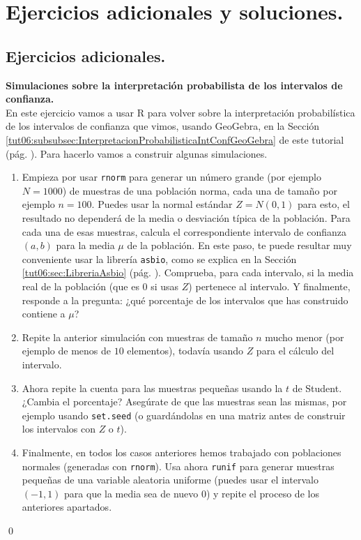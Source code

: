 \documentclass[10pt,a4paper]{article}\usepackage[]{graphicx}\usepackage[]{color}
\newcounter {cont01}
\begin{document}
\section{Ejercicios adicionales y soluciones.}
\label{tut06:sec:EjerciciosAdicionalesYSoluciones}

\subsection*{Ejercicios adicionales.}
\label{tut06:subsec:EjerciciosAdicionales}

\begin{ejercicio}
\label{tut06:ejercicio26}


{\bf Simulaciones sobre  la interpretación probabilista de los intervalos de confianza.}\\
\noindent
En este ejercicio vamos a usar R para volver sobre la interpretación probabilística de los intervalos de confianza que vimos, usando GeoGebra, en la Sección \ref{tut06:subsubsec:InterpretacionProbabilisticaIntConfGeoGebra} de este tutorial (pág. \pageref{tut06:subsubsec:InterpretacionProbabilisticaIntConfGeoGebra}). Para hacerlo vamos a construir algunas simulaciones.

\begin{enumerate}
  \item Empieza por usar {\tt rnorm} para generar un número grande (por ejemplo $N=1000$) de muestras de una población norma, cada una de tamaño por ejemplo $n=100$. Puedes usar la normal estándar $Z=N(0, 1)$ para esto, el resultado no dependerá de la media o desviación típica de la población. Para cada una de esas muestras, calcula el correspondiente intervalo de confianza $(a, b)$ para la media $\mu$ de la población. En este paso, te puede resultar muy conveniente usar la librería {\tt asbio}, como se explica en la Sección \ref{tut06:sec:LibreriaAsbio} (pág. \pageref{tut06:sec:LibreriaAsbio}). Comprueba, para cada intervalo, si la media real de la población (que es $0$ si usas $Z$) pertenece al intervalo. Y finalmente, responde a la pregunta: ¿qué porcentaje de los intervalos que has construido contiene a $\mu$?
  \item Repite la anterior simulación con muestras de tamaño $n$ mucho menor (por ejemplo de menos de $10$ elementos), todavía usando $Z$ para el cálculo del intervalo.
  \item Ahora repite la cuenta para las muestras pequeñas usando la $t$ de Student. ¿Cambia el porcentaje? Asegúrate de que las muestras sean las mismas, por ejemplo  usando {\tt set.seed} (o guardándolas en una matriz antes de construir los intervalos con $Z$ o $t$).
  \item Finalmente, en todos los casos anteriores hemos trabajado con poblaciones normales (generadas con {\tt rnorm}). Usa ahora {\tt runif} para generar muestras pequeñas de una variable aleatoria uniforme (puedes usar el intervalo $(-1, 1)$ para que la media sea de nuevo $0$) y repite el proceso de los anteriores apartados.
\end{enumerate}
\qed
\end{ejercicio}
\end{document}
